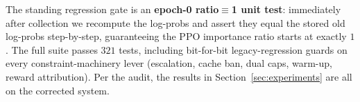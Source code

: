 The standing regression gate is an \textbf{epoch-0 ratio$\equiv$1 unit
test}: immediately after collection we recompute the log-probs and assert
they equal the stored old log-probs step-by-step, guaranteeing the PPO
importance ratio starts at exactly $1$. The full suite passes $321$ tests,
including bit-for-bit legacy-regression guards on every constraint-machinery
lever (escalation, cache ban, dual caps, warm-up, reward attribution).
Per the audit, the results in Section~\ref{sec:experiments} are all on
the corrected system.
